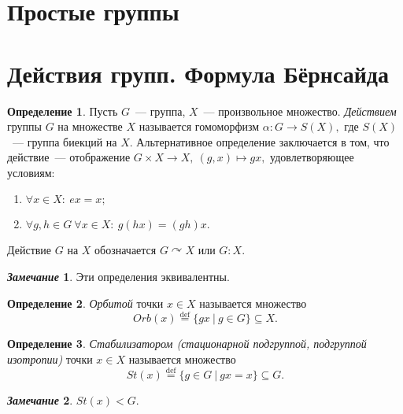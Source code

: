 \documentclass[a4paper, 14pt]{extarticle}
\newcommand{\deq}{\stackrel{\mathrm{def}}{=}}
\theoremstyle{definition}
\newtheorem*{remark}{\textit{Замечание}}
\newtheorem{definition}{Определение}
\theoremstyle{plain}
\numberwithin{theorem}{section}
\numberwithin{definition}{section}
\numberwithin{statement}{section}
\numberwithin{lemma}{section}
\numberwithin{consequence}{section}
\begin{document}
        \newpage
        \section{Простые группы}
        \setcounter{definition}{0}

        \newpage
        \section{Действия групп. Формула Бёрнсайда}
        \setcounter{definition}{0}
        \begin{definition}
            Пусть $G$~--- группа, $X$~--- произвольное множество. \textit{Действием} группы $G$ на множестве $X$ называется гомоморфизм ${\alpha : G \rightarrow S(X),}$ где $S(X)$~--- группа биекций на $X$. Альтернативное определение заключается в том, что действие~--- отображение ${G \times X \rightarrow X, \ (g,x) \mapsto gx,}$ удовлетворяющее условиям:
            \begin{enumerate}
                \setlength\itemsep{0.1em}
                \item $\forall x \in X{:} \  ex = x;$
                \item $\forall g,h \in G \ \forall x \in X{:} \ g(hx) = (gh)x.$
            \end{enumerate}
            Действие $G$ на $X$ обозначается $G \curvearrowright X$ или $G : X$.
        \end{definition}
        \begin{remark}
            Эти определения эквивалентны.
        \end{remark}
        \begin{definition}
            \textit{Орбитой} точки ${x \in X}$ называется множество
            \begin{equation*}
                Orb(x) \deq \{gx \ | \ g \in G\} \subseteq X.
            \end{equation*}
        \end{definition}
        \begin{definition}
            \textit{Стабилизатором (стационарной подгруппой, подгруппой изотропии)} точки ${x \in X}$ называется множество
            \begin{equation*}
                St(x) \deq \{g \in G \ | \ gx = x\} \subseteq G.
            \end{equation*}
        \end{definition}
        \begin{remark}
            $St(x) < G.$
        \end{remark}
\end{document}
